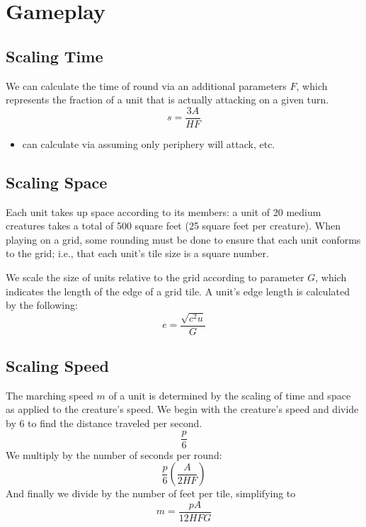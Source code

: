 \documentclass[twocolumn]{article}
\begin{document}
\section{Gameplay}\label{sec:game}

\subsection{Scaling Time}
We can calculate the time of round via an additional parameters $F$,
which represents the fraction of a unit that is actually attacking on a given turn.
\[
    s = \frac
        {3 A}
        {H F}
\]
\begin{itemize}
    \item can calculate via assuming only periphery will attack, etc.
\end{itemize}


\subsection{Scaling Space}

Each unit takes up space according to its members:
a unit of 20 medium creatures takes a total of 500 square feet (25 square feet per creature).
When playing on a grid,
some rounding must be done to ensure that each unit conforms to the grid;
i.e., that each unit's tile size is a square number.

We scale the size of units relative to the grid
according to parameter $G$,
which indicates the length of the edge of a grid tile.
A unit's edge length is calculated by the following:
\[
    e = \frac
        {\sqrt{c^2 u}}
        {G}
\]

\subsection{Scaling Speed}
The marching speed $m$ of a unit is determined
by the scaling of time and space
as applied to the creature's speed.
We begin with the creature's speed and divide by 6
to find the distance traveled per second.
\[
    \frac
        {p}
        {6}
\]
We multiply by the number of seconds per round:
\[
    \frac
        {p}
        {6}
    \left(
        \frac
            {A}
            {2 H F}
    \right)
\]
And finally we divide by the number of feet per tile,
simplifying to
\[
    m = \frac
        {p A}
        {12 H F G}
\]
\end{document}
